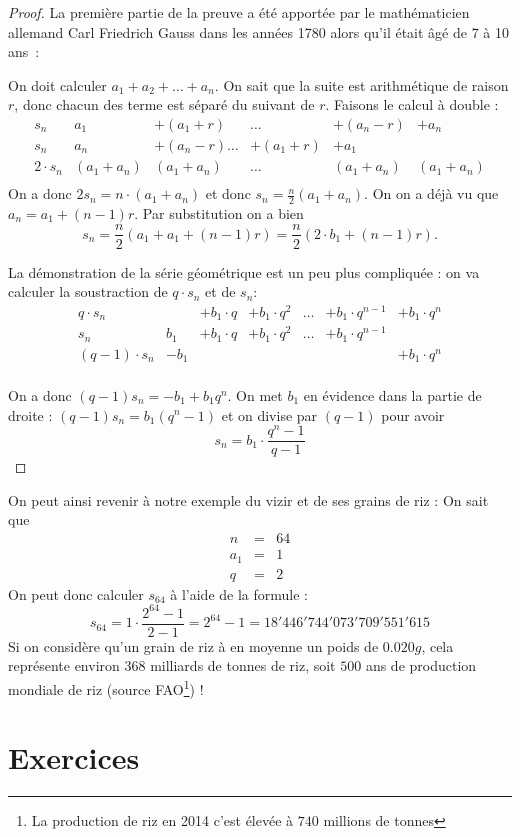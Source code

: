\begin{proof}
La première partie de la preuve a été apportée par le mathématicien allemand Carl Friedrich Gauss dans les années 1780 alors qu'il était âgé de 7 à 10 ans~\cite{kehlmann2011arpenteurs}:

On doit calculer $a_1+a_2+\dots + a_n$. On sait que la suite est arithmétique de raison $r$, donc chacun des terme est séparé du suivant de $r$. Faisons le calcul à double :
$$
\begin{array}{l|ccccc}
s_n & a_1 & +(a_1 + r) & \dots & + (a_n -r) & + a_n\\
s_n & a_n & +(a_n-r) \dots & +(a_1 + r) & + a_1 \\
\hline
2\cdot s_n & (a_1 + a_n) & (a_1 + a_n) & \dots & (a_1 + a_n) & (a_1 + a_n) \\
\end{array}
$$
On a donc $2s_n = n \cdot (a_1+a_n)$ et donc $s_n = \frac{n}{2}(a_1 + a_n)$. On on a déjà vu que $a_n = a_1  +(n-1)r$. Par substitution on a bien 
$$
s_n = \frac{n}{2}\left(a_1 + a_1 + (n-1)r \right) = \frac{n}{2}\left(2\cdot b_1 + (n-1) r \right).
$$

La démonstration de la série géométrique est un peu plus compliquée : on va calculer la soustraction de $q \cdot s_n$ et de $s_n$: 
$$
\begin{array}{l|cccccc}
q\cdot s_n & & +b_1 \cdot q &+ b_1 \cdot q^2 & \dots & + b_1 \cdot q^{n-1} & + b_1 \cdot q^n\\
s_n & b_1 & +b_1 \cdot q &+ b_1 \cdot q^2 & \dots & + b_1 \cdot q^{n-1} & \\
\hline
(q-1) \cdot s_n & -b_1  &&&&& + b_1 \cdot q^n \\
\end{array}
$$

On a donc $(q-1)s_n = -b_1 + b_1 q^n$. On met $b_1$ en évidence dans la partie de droite : $(q-1)s_n = b_1(q^n-1)$ et on divise par $(q-1)$ pour avoir 
$$
s_n = b_1 \cdot \frac{q^n-1}{q-1}
$$
\end{proof}

On peut ainsi revenir à notre exemple du vizir et de ses grains de riz :
On sait que 
$$
\begin{array}{lcl}
n &=& 64 \\
a_1 &=& 1 \\
q &=& 2
\end{array}
$$
On peut donc calculer $s_{64}$ à l'aide de la formule :
$$
s_{64} = 1 \cdot \frac{2^{64}-1}{2-1} = 2^{64} -1 = 18'446'744'073'709'551'615
$$
Si on considère qu'un grain de riz à en moyenne un poids de $0.020g$, cela représente environ $368$ milliards de tonnes de riz, soit $500$ ans de production mondiale de riz (source FAO\footnote{La production de riz en 2014 c'est élevée à $740$ millions de tonnes}) !

\section{Exercices}


